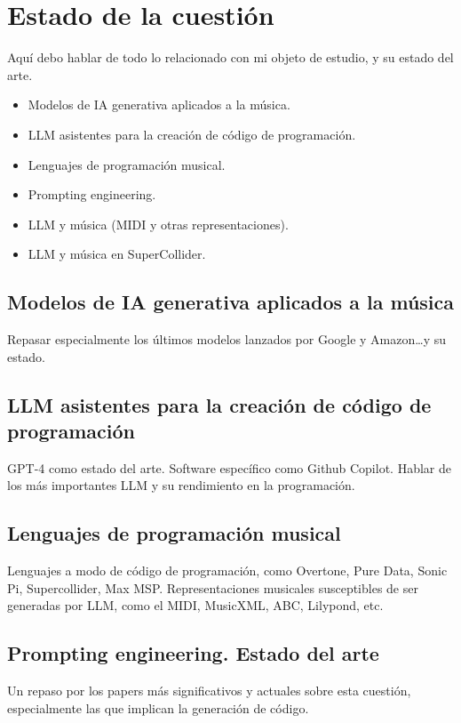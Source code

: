 \chapter{Estado de la cuestión}
\label{chap:estado_cuestion}

Aquí debo hablar de todo lo relacionado con mi objeto de estudio, y su estado del arte.


\begin{itemize}
    \item Modelos de IA generativa aplicados a la música.
    \item LLM asistentes para la creación de código de programación.
    \item Lenguajes de programación musical.
    \item Prompting engineering.
    \item LLM y música (MIDI y otras representaciones).
    \item LLM y música en SuperCollider.
\end{itemize}

\section{Modelos de IA generativa aplicados a la música}
    Repasar especialmente los últimos modelos lanzados por Google y Amazon\dots y su estado.

\section{LLM asistentes para la creación de código de programación}
    GPT-4 como estado del arte. Software específico como Github Copilot. Hablar de los más importantes LLM y su rendimiento en la programación.

\section{Lenguajes de programación musical}
    Lenguajes a modo de código de programación, como Overtone, Pure Data, Sonic Pi, Supercollider, Max MSP. Representaciones musicales susceptibles de ser generadas por LLM, como el MIDI, MusicXML, ABC, Lilypond, etc.

\section{Prompting engineering. Estado del arte}
    Un repaso por los papers más significativos y actuales sobre esta cuestión, especialmente las que implican la generación de código.

